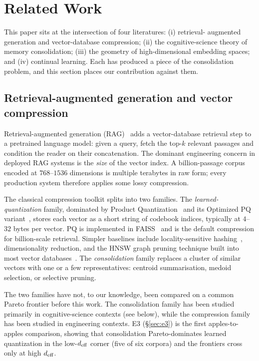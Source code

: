 \section{Related Work}
\label{sec:related}

\begin{intuition}
This paper sits at the intersection of four literatures: (i) retrieval-
augmented generation and vector-database compression; (ii) the
cognitive-science theory of memory consolidation; (iii) the geometry
of high-dimensional embedding spaces; and (iv) continual learning.
Each has produced a piece of the consolidation problem, and this
section places our contribution against them.
\end{intuition}

\subsection{Retrieval-augmented generation and vector compression}
\label{sec:related:rag}

Retrieval-augmented generation (RAG)~\cite{lewisRAG2020,
guu2020realm, karpukhin2020dpr, borgeaud2022retro, izacardAtlas2023,
izacard2021fid} adds a vector-database retrieval step to a
pretrained language model: given a query, fetch the top-$k$ relevant
passages and condition the reader on their concatenation. The
dominant engineering concern in deployed RAG systems is the
\emph{size} of the vector index. A billion-passage corpus encoded at
$768$--$1536$ dimensions is multiple terabytes in raw form; every
production system therefore applies some lossy compression.

The classical compression toolkit splits into two families. The
\emph{learned-quantization} family, dominated by Product
Quantization~\cite{jegouPQ2011} and its Optimized PQ
variant~\cite{ge2013optimized}, stores each vector as a short string of
codebook indices, typically at $4$--$32$ bytes per vector. PQ is
implemented in FAISS~\cite{johnson2019faiss} and is the default
compression for billion-scale retrieval. Simpler baselines include
locality-sensitive hashing~\cite{charikarLSH2002, datarLSH2004},
dimensionality reduction, and the HNSW graph pruning technique
built into most vector databases~\cite{malkovHNSW2018}. The
\emph{consolidation} family replaces a cluster of similar vectors
with one or a few representatives: centroid summarisation, medoid
selection, or selective pruning.

The two families have not, to our knowledge, been compared on a
common Pareto frontier before this work. The consolidation family
has been studied primarily in cognitive-science contexts (see
below), while the compression family has been studied in
engineering contexts. E3 (\S\ref{sec:e3}) is the first apples-to-apples
comparison, showing that consolidation Pareto-dominates learned
quantization in the low-${d_{\mathrm{eff}}}$ corner (five of six corpora) and
the frontiers cross only at high ${d_{\mathrm{eff}}}$.

